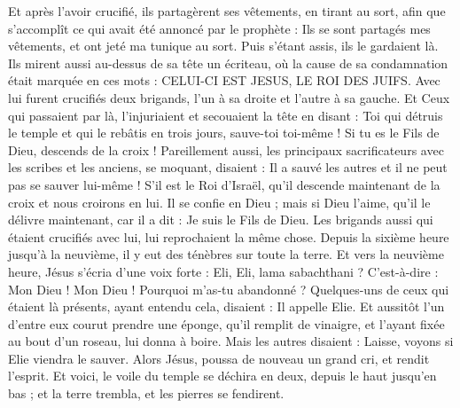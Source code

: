 \begin{multicols}{2}
Et après l'avoir crucifié, ils partagèrent ses vêtements, en tirant au sort, afin que s'accomplît ce qui avait été annoncé par le prophète : Ils se sont partagés mes vêtements, et ont jeté ma tunique au sort.
Puis s'étant assis, ils le gardaient là.
Ils mirent aussi au-dessus de sa tête un écriteau, où la cause de sa condamnation était marquée en ces mots : CELUI-CI EST JESUS, LE ROI DES JUIFS.
Avec lui furent crucifiés deux brigands, l'un à sa droite et l'autre à sa gauche.
Et Ceux qui passaient par là, l'injuriaient et secouaient la tête
en disant : Toi qui détruis le temple et qui le rebâtis en trois jours, sauve-toi toi-même ! Si tu es le Fils de Dieu, descends de la croix !
Pareillement aussi, les principaux sacrificateurs avec les scribes et les anciens, se moquant, disaient :
Il a sauvé les autres et il ne peut pas se sauver lui-même ! S'il est le Roi d'Israël, qu'il descende maintenant de la croix et nous croirons en lui.
Il se confie en Dieu ; mais si Dieu l'aime, qu'il le délivre maintenant, car il a dit : Je suis le Fils de Dieu.
Les brigands aussi qui étaient crucifiés avec lui, lui reprochaient la même chose.
Depuis la sixième heure jusqu'à la neuvième, il y eut des ténèbres sur toute la terre.
Et vers la neuvième heure, Jésus s'écria d'une voix forte : Eli, Eli, lama sabachthani ? C'est-à-dire : Mon Dieu ! Mon Dieu ! Pourquoi m'as-tu abandonné ?
Quelques-uns de ceux qui étaient là présents, ayant entendu cela, disaient : Il appelle Elie.
Et aussitôt l'un d'entre eux courut prendre une éponge, qu'il remplit de vinaigre, et l'ayant fixée au bout d'un roseau, lui donna à boire.
Mais les autres disaient : Laisse, voyons si Elie viendra le sauver.
Alors Jésus, poussa de nouveau un grand cri, et rendit l'esprit.
Et voici, le voile du temple se déchira en deux, depuis le haut jusqu'en bas ; et la terre trembla, et les pierres se fendirent.

\end{multicols}
